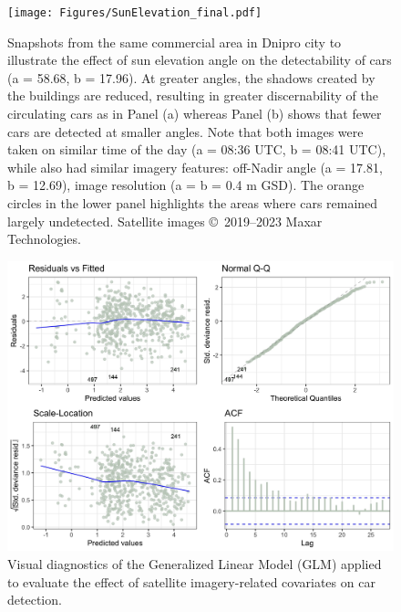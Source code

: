 \documentclass[sn-basic]{sn-jnl}%
\begin{document}
{\begin{appendices}
\begin{figure}[htbp]
\begin{center}
\texttt{[image: Figures/SunElevation\_final.pdf]}
\end{center}
\caption{Snapshots from the same commercial area in Dnipro city to illustrate the effect of sun elevation angle on the detectability of cars (a = 58.68\textdegree, b = 17.96\textdegree). At greater angles, the shadows created by the buildings are reduced, resulting in greater discernability of the circulating cars as in Panel (a) whereas Panel (b) shows that fewer cars are detected at smaller angles. Note that both images were taken on similar time of the day (a = 08:36 UTC, b = 08:41 UTC), while also had similar imagery features:  off-Nadir angle (a = 17.81\textdegree , b = 12.69\textdegree), image resolution (a = b = 0.4 m GSD). The orange circles in the lower panel highlights the areas where cars remained largely undetected. Satellite images \copyright ~2019--2023 Maxar Technologies.
}
\label{figSM_SunElevation}
\end{figure}



\begin{figure}[htbp]
\begin{center}
\includegraphics[width=\textwidth]{Figures/GLM_diagnostics.jpg}
\end{center}
\caption{Visual diagnostics of the Generalized Linear Model (GLM) applied to evaluate the effect of satellite imagery-related covariates on car detection.}
\label{figSM_Diagnostics}
\end{figure}



\end{appendices}}
\end{document}

